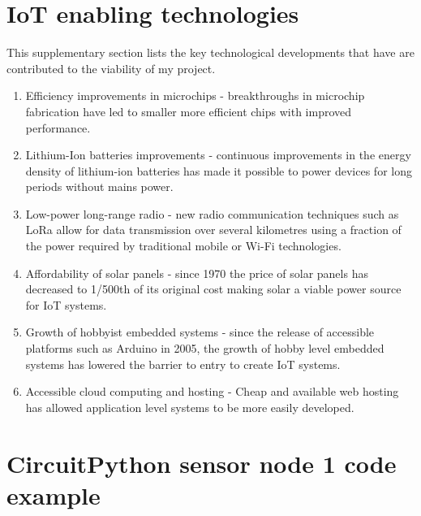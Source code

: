 \section{IoT enabling technologies} \label{app:enabling-tech}

This supplementary section lists the key technological developments that have
are contributed to the viability of my project.

\begin{enumerate}
  \item Efficiency improvements in microchips - breakthroughs in microchip
  fabrication have led to smaller more efficient chips with improved
  performance.
  \item Lithium-Ion batteries improvements - continuous improvements in the
  energy density of lithium-ion batteries has made it possible to power devices
  for long periods without mains power.
  \item Low-power long-range radio - new radio communication techniques such as
  LoRa allow for data transmission over several kilometres using a fraction of
  the power required by traditional mobile or Wi-Fi technologies.
  \item Affordability of solar panels - since 1970 the price of solar panels has
  decreased to 1/500th of its original cost \cite{economist2024} making solar a
  viable power source for IoT systems.
  \item Growth of hobbyist embedded systems - since the release of accessible
  platforms such as Arduino in 2005, the growth of hobby level embedded systems
  has lowered the barrier to entry to create IoT systems.
  \item Accessible cloud computing and hosting - Cheap and available web hosting
  has allowed application level systems to be more easily developed.
\end{enumerate}

\section{CircuitPython sensor node 1 code example}\label{app:sensor-code}

